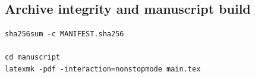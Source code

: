 \subsection{Archive integrity and manuscript build}

\begin{lstlisting}[style=repo]
sha256sum -c MANIFEST.sha256

cd manuscript
latexmk -pdf -interaction=nonstopmode main.tex
\end{lstlisting}
